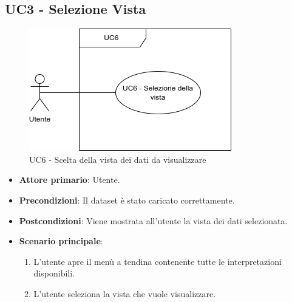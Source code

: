 

\subsection{UC3 - Selezione Vista}
\label{sec:UC6}
\begin{figure}[h!]
    \centering
    \includegraphics[scale=0.55]{../../assets/scelta_vista.png}
    \caption{UC6 - Scelta della vista dei dati da visualizzare}
\end{figure}
\begin{itemize}
    \item \textbf{Attore primario}: Utente.
    \item \textbf{Precondizioni}: Il dataset è stato caricato correttamente.
    \item \textbf{Postcondizioni}: Viene mostrata all'utente la vista dei dati selezionata.
    \item \textbf{Scenario principale}:
          \begin{enumerate}
              \item L'utente apre il menù a tendina contenente tutte le interpretazioni disponibili.
              \item L'utente seleziona la vista che vuole visualizzare.
          \end{enumerate}
\end{itemize}
\newpage


